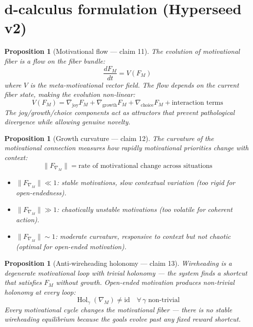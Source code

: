 \documentclass[11pt,a4paper]{article}
\newtheorem{proposition}[definition]{Proposition}
\begin{document}
\section{d-calculus formulation (Hyperseed v2)}

\begin{proposition}[Motivational flow --- claim 11]
\label{prop:flow}
The evolution of motivational fiber is a flow on the fiber bundle:
\[
  \frac{dF_M}{dt} = V(F_M)
\]
where $V$ is the meta-motivational vector field. The flow depends on
the current fiber state, making the evolution non-linear:
\[
  V(F_M) = \nabla_{\text{joy}} F_M + \nabla_{\text{growth}} F_M +
    \nabla_{\text{choice}} F_M + \text{interaction terms}
\]
The joy/growth/choice components act as attractors that prevent
pathological divergence while allowing genuine novelty.
\end{proposition}

\begin{proposition}[Growth curvature --- claim 12]
\label{prop:curvature}
The curvature of the motivational connection measures how rapidly
motivational priorities change with context:
\[
  \|F_{\nabla_M}\| = \text{rate of motivational change across situations}
\]
\begin{itemize}
  \item $\|F_{\nabla_M}\| \ll 1$: stable motivations, slow contextual
    variation (too rigid for open-endedness).
  \item $\|F_{\nabla_M}\| \gg 1$: chaotically unstable motivations
    (too volatile for coherent action).
  \item $\|F_{\nabla_M}\| \sim 1$: moderate curvature, responsive to
    context but not chaotic (optimal for open-ended motivation).
\end{itemize}
\end{proposition}

\begin{proposition}[Anti-wireheading holonomy --- claim 13]
\label{prop:wireheading}
Wireheading is a degenerate motivational loop with trivial holonomy ---
the system finds a shortcut that satisfies $F_M$ without growth.
Open-ended motivation produces non-trivial holonomy at every loop:
\[
  \operatorname{Hol}_\gamma(\nabla_M) \neq \mathrm{id} \quad
  \forall\, \gamma \text{ non-trivial}
\]
Every motivational cycle changes the motivational fiber --- there is
no stable wireheading equilibrium because the goals evolve past any
fixed reward shortcut.
\end{proposition}
\end{document}
